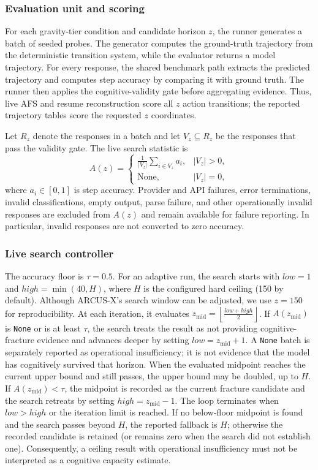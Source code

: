 \documentclass{article}
\begin{document}
\subsubsection{Evaluation unit and scoring}
For each gravity-tier condition and candidate horizon $z$, the runner generates a batch of seeded probes. The generator computes the ground-truth trajectory from the deterministic transition system, while the evaluator returns a model trajectory. For every response, the shared benchmark path extracts the predicted trajectory and computes step accuracy by comparing it with ground truth. The runner then applies the cognitive-validity gate before aggregating evidence. Thus, live AFS and resume reconstruction score all $z$ action transitions; the reported trajectory tables score the requested $z$ coordinates.

Let $R_z$ denote the responses in a batch and let $V_z\subseteq R_z$ be the responses that pass the validity gate. The live search statistic is
\[
A(z)=
\begin{cases}
\frac{1}{|V_z|}\sum_{i\in V_z} a_i, & |V_z|>0,\\
\mathrm{None}, & |V_z|=0,
\end{cases}
\]
where $a_i\in[0,1]$ is step accuracy. Provider and API failures, error terminations, invalid classifications, empty output, parse failure, and other operationally invalid responses are excluded from $A(z)$ and remain available for failure reporting. In particular, invalid responses are not converted to zero accuracy.

\subsubsection{Live search controller}
The accuracy floor is $\tau=0.5$. For an adaptive run, the search starts with $low=1$ and $high=\min(40,H)$, where $H$ is the configured hard ceiling (150 by default). Although ARCUS-X's search window can be adjusted, we use $z=150$ for reproducibility. At each iteration, it evaluates
$z_{\mathrm{mid}}=\left\lfloor\frac{low+high}{2}\right\rfloor$.
If $A(z_{\mathrm{mid}})$ is \texttt{None} or is at least $\tau$, the search treats the result as not providing cognitive-fracture evidence and advances deeper by setting $low=z_{\mathrm{mid}}+1$. A \texttt{None} batch is separately reported as operational insufficiency; it is not evidence that the model has cognitively survived that horizon. When the evaluated midpoint reaches the current upper bound and still passes, the upper bound may be doubled, up to $H$. If $A(z_{\mathrm{mid}})<\tau$, the midpoint is recorded as the current fracture candidate and the search retreats by setting $high=z_{\mathrm{mid}}-1$. The loop terminates when $low>high$ or the iteration limit is reached. If no below-floor midpoint is found and the search passes beyond $H$, the reported fallback is $H$; otherwise the recorded candidate is retained (or remains zero when the search did not establish one). Consequently, a ceiling result with operational insufficiency must not be interpreted as a cognitive capacity estimate.
\end{document}
